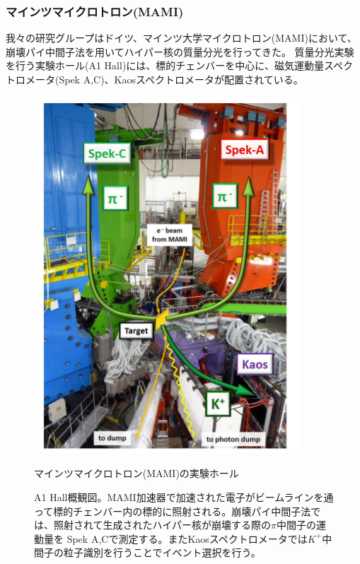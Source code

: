\documentclass[a4paper,11pt,uplatex]{jsbook}
\begin{document}
\subsubsection{マインツマイクロトロン(MAMI)}
我々の研究グループはドイツ、マインツ大学マイクロトロン(MAMI)において、崩壊パイ中間子法を用いてハイパー核の質量分光を行ってきた。
質量分光実験を行う実験ホール(A1 Hall)には、標的チェンバーを中心に、磁気運動量スペクトロメータ(Spek A,C)、Kaosスペクトロメータが配置されている。
\begin{figure}[tb]
  \centering
  \includegraphics[width=10cm]{image/1-HallA.png}
  \caption{マインツマイクロトロン(MAMI)の実験ホール}
  \caption[MAMI実験ホール]{A1 Hall概観図。MAMI加速器で加速された電子がビームラインを通って標的チェンバー内の標的に照射される。崩壊パイ中間子法では、照射されて生成されたハイパー核が崩壊する際の$\pi$中間子の運動量を
  Spek A,Cで測定する。またKaosスペクトロメータでは$K^+$中間子の粒子識別を行うことでイベント選択を行う。}
\end{figure}
\end{document}
